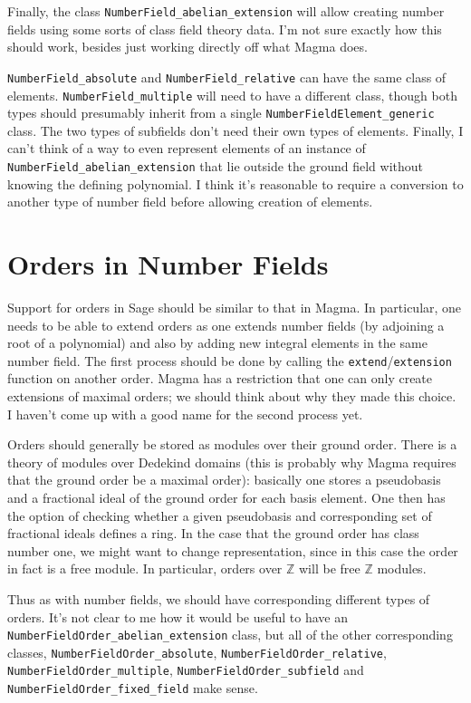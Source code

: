 \documentclass[12pt]{article}
\begin{document}
Finally, the class \texttt{NumberField\_abelian\_extension} will allow creating number fields using some sorts of class field theory data.  I'm not sure exactly how this should work, besides just working directly off what Magma does.

\texttt{NumberField\_absolute} and \texttt{NumberField\_relative} can have the same class of elements.  \texttt{NumberField\_multiple} will need to have a different class, though both types should presumably inherit from a single \texttt{NumberFieldElement\_generic} class.  The two types of subfields don't need their own types of elements.  Finally, I can't think of a way to even represent elements of an instance of \texttt{NumberField\_abelian\_extension} that lie outside the ground field without knowing the defining polynomial.  I think it's reasonable to require a conversion to another type of number field before allowing creation of elements.

\section{Orders in Number Fields} \label{Orders}

Support for orders in Sage should be similar to that in Magma.  In particular, one needs to be able to extend orders as one extends number fields (by adjoining a root of a polynomial) and also by adding new integral elements in the same number field.  The first process should be done by calling the \texttt{extend}/\texttt{extension} function on another order.  Magma has a restriction that one can only create extensions of maximal orders; we should think about why they made this choice.  I haven't come up with a good name for the second process yet.

Orders should generally be stored as modules over their ground order.  There is a theory of modules over Dedekind domains (this is probably why Magma requires that the ground order be a maximal order): basically one stores a pseudobasis and a fractional ideal of the ground order for each basis element.  One then has the option of checking whether a given pseudobasis and corresponding set of fractional ideals defines a ring.  In the case that the ground order has class number one, we might want to change representation, since in this case the order in fact is a free module.  In particular, orders over $\mathbb{Z}$ will be free $\mathbb{Z}$ modules.

Thus as with number fields, we should have corresponding different types of orders.  It's not clear to me how it would be useful to have an \texttt{NumberFieldOrder\_abelian\_extension} class, but all of the other corresponding classes, \texttt{NumberFieldOrder\_absolute}, \texttt{NumberFieldOrder\_relative}, \texttt{NumberFieldOrder\_multiple}, \texttt{NumberFieldOrder\_subfield} and \texttt{NumberFieldOrder\_fixed\_field} make sense.
\end{document}
